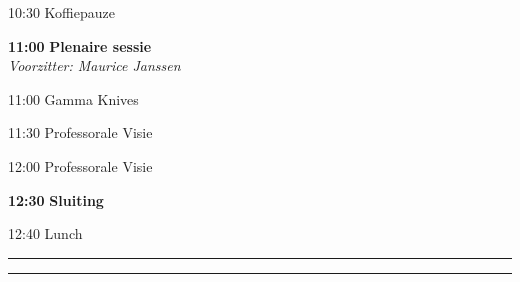 \documentclass[a4paper,10pt]{report}
\begin{document}
\begin{multicols*}{3}
    \columnbreak
{} %

\begin{packed_enum}
\item[{\color{DarkBlue}{\textbf{09:00}}}]{ }
        \vfill
\item[10:30] Koffiepauze
        \vfill
\item[\textbf{11:00}] {\textbf{Plenaire sessie}}\\\textit{Voorzitter: Maurice Janssen}
\item[11:00] Gamma Knives
\item[11:30] Professorale Visie
\item[12:00] Professorale Visie
        \vfill
\item[\textbf{12:30}] \textbf{Sluiting}
\vfill
\item[12:40] Lunch
\end{packed_enum}%






\vfill

\hrule \vspace{2mm}
\vspace{2mm}\hrule\strut


\end{multicols*}
\end{document}
